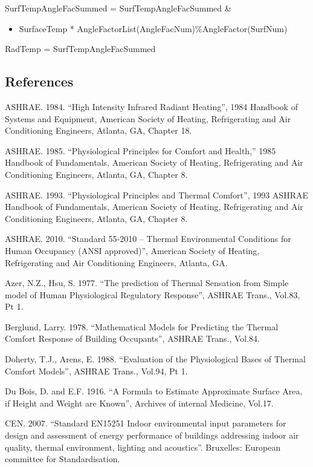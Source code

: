 SurfTempAngleFacSummed = SurfTempAngleFacSummed \&

\begin{itemize}
\tightlist
\item
  SurfaceTemp * AngleFactorList(AngleFacNum)\%AngleFactor(SurfNum)
\end{itemize}

RadTemp = SurfTempAngleFacSummed

\subsection{References}\label{references-1-012}

ASHRAE. 1984. ``High Intensity Infrared Radiant Heating'', 1984 Handbook of Systems and Equipment, American Society of Heating, Refrigerating and Air Conditioning Engineers, Atlanta, GA, Chapter 18.

ASHRAE. 1985. ``Physiological Principles for Comfort and Health,'' 1985 Handbook of Fundamentals, American Society of Heating, Refrigerating and Air Conditioning Engineers, Atlanta, GA, Chapter 8.

ASHRAE. 1993. ``Physiological Principles and Thermal Comfort'', 1993 ASHRAE Handbook of Fundamentals, American Society of Heating, Refrigerating and Air Conditioning Engineers, Atlanta, GA, Chapter 8.

ASHRAE. 2010. ``Standard 55-2010 -- Thermal Environmental Conditions for Human Occupancy (ANSI approved)'', American Society of Heating, Refrigerating and Air Conditioning Engineers, Atlanta, GA.

Azer, N.Z., Hsu, S. 1977. ``The prediction of Thermal Sensation from Simple model of Human Physiological Regulatory Response'', ASHRAE Trans., Vol.83, Pt 1.

Berglund, Larry. 1978. ``Mathematical Models for Predicting the Thermal Comfort Response of Building Occupants'', ASHRAE Trans., Vol.84.

Doherty, T.J., Arens, E. 1988. ``Evaluation of the Physiological Bases of Thermal Comfort Models'', ASHRAE Trans., Vol.94, Pt 1.

Du Bois, D. and E.F. 1916. ``A Formula to Estimate Approximate Surface Area, if Height and Weight are Known'', Archives of internal Medicine, Vol.17.

CEN. 2007. ``Standard EN15251 Indoor environmental input parameters for design and assessment of energy performance of buildings addressing indoor air quality, thermal environment, lighting and acoustics''. Bruxelles: European committee for Standardisation.

